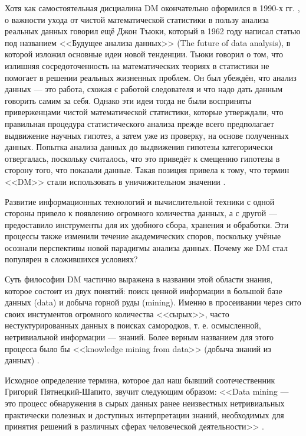 Хотя как самостоятельная дисциалина DM окончательно оформился в 1990-х гг. \cite[стр. 15]{handbook_stat_dm}, о важности ухода от чистой математической статистики в пользу анализа реальных данных говорил ещё Джон Тъюки, который в 1962 году написал статью под названием <<Будущее анализа данных>> (The future of data analysis), в которой изложил основные идеи новой тенденции. Тьюки говорил о том, что излишняя сосредоточенность на математических теориях в статистики не помогает в решении реальных жизненных проблем. Он был убеждён, что анализ данных --- это работа, схожая с работой следователя и что надо дать данным говорить самим за себя. Однако эти идеи тогда не были восприняты приверженцами чистой математической статистики, которые утверждали, что правильная процедура статистического анализа прежде всего предполагает выдвижение научных гипотез, а затем уже из проверку, на основе полученных данных. Попытка анализа данных до выдвижения гипотезы категорически отвергалась, поскольку считалось, что это приведёт к смещению гипотезы в сторону того, что показали данные. Такая позиция привела к тому, что термин <<DM>> стали использовать в уничижительном значении \cite[стр. 788]{HandbookCS}.

Развитие информационных технологий и вычислительной техники с одной стороны привело к появлению огромного количества данных, а с другой --- предоставило инструменты для их удобного сбора, хранения и обработки. Эти процессы также изменили течение академических споров, поскольку учёные осознали перспективы новой парадигмы анализа данных. Почему же DM стал популярен в сложившихся условиях?

Суть философии DM частично выражена в названии этой области знания, которое состоит из двух понятий: поиск ценной информации в большой базе данных (data) и добыча горной руды (mining). Именно в просеивании через сито своих инстументов огромного количества <<сырых>>, часто нестуктурированных данных в поисках самородков, т. е. осмысленной, нетривиальной информации --- знаний. Более верным названием для этого процесса было бы <<knowledge mining from data>> (добыча знаний из данных) \cite[стр. 5]{Han2006}.

Исходное определение термина, которое дал наш бывший соотечественник Григорий Пятнецкий-Шапито, звучит следующим образом: <<Data mining --- это процесс обнаружения в сырых данных ранее неизвестных нетривиальных практически полезных и доступных интерпретации знаний, необходимых для принятия решений в различных сферах человеческой деятельности>> \cite[стр. 78]{Duk2011}.


